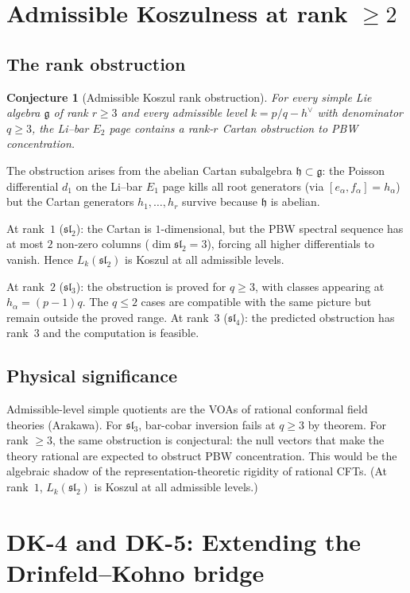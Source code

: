 \documentclass[11pt]{amsart}
\newcommand{\g}{\mathfrak{g}}
\newcommand{\h}{\mathfrak{h}}
\newcommand{\fsl}{\mathfrak{sl}}
\theoremstyle{plain}
\newtheorem{conjecture}[theorem]{Conjecture}
\theoremstyle{definition}
\theoremstyle{remark}
\begin{document}
\section{Admissible Koszulness at rank $\geq 2$}

\subsection{The rank obstruction}

\begin{conjecture}[Admissible Koszul rank obstruction]
For every simple Lie algebra $\g$ of rank $r \geq 3$ and every
admissible level $k = p/q - h^\vee$ with denominator $q \geq 3$,
the Li--bar $E_2$ page contains a rank-$r$ Cartan obstruction to
PBW concentration.
\end{conjecture}

The obstruction arises from the abelian Cartan subalgebra
$\h \subset \g$: the Poisson differential $d_1$ on the Li--bar
$E_1$ page kills all root generators
(via $[e_\alpha, f_\alpha] = h_\alpha$) but the Cartan
generators $h_1, \ldots, h_r$ survive because $\h$ is abelian.

At rank~$1$ ($\fsl_2$): the Cartan is $1$-dimensional, but the
PBW spectral sequence has at most $2$ non-zero columns
($\dim \fsl_2 = 3$), forcing all higher differentials to vanish.
Hence $L_k(\fsl_2)$ is Koszul at all admissible levels.

At rank~$2$ ($\fsl_3$): the obstruction is proved for
$q \geq 3$, with classes appearing at $h_\alpha=(p-1)q$.
The $q\leq 2$ cases are compatible with the same picture but
remain outside the proved range.  At rank~$3$ ($\fsl_4$):
the predicted obstruction has rank~$3$ and the computation is
feasible.

\subsection{Physical significance}

Admissible-level simple quotients are the VOAs of rational
conformal field theories (Arakawa).  For $\fsl_3$, bar-cobar
inversion fails at $q\geq3$ by theorem.  For rank $\geq3$, the
same obstruction is conjectural: the null vectors that make the
theory rational are expected to obstruct PBW concentration.  This would be the
algebraic shadow of the representation-theoretic rigidity of
rational CFTs. (At rank~$1$, $L_k(\fsl_2)$ is Koszul at all
admissible levels.)


\section{DK-4 and DK-5: Extending the Drinfeld--Kohno bridge}
\end{document}
